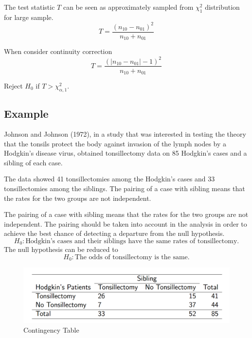 The test statistic $T$ can be seen as approximately sampled from $\chi^2_1$ distribution for large sample.
\[T = \frac{(n_{10} - n_{01})^2}{n_{10} + n_{01}}\]

When consider continuity correction
\[T = \frac{(|n_{10} - n_{01}| - 1 )^2}{n_{10} + n_{01}}\]

Reject $H_0$ if $T > \chi_{\alpha,1}^2$.

\subsection{Example}
Johnson and Johnson (1972), in a study that was interested in
testing the theory that the tonsils protect the body against
invasion of the lymph nodes by a Hodgkin's disease virus,
obtained tonsillectomy data on 85 Hodgkin's cases and a sibling
of each case.

The data showed 41 tonsillectomies among the Hodgkin's cases
and 33 tonsillectomies among the siblings.
The pairing of a case with sibling means that the rates for the
two groups are not independent.

The pairing of a case with sibling means that the rates for the
two groups are not independent.
The pairing should be taken into account in the analysis in order
to achieve the best chance of detecting a departure from the null
hypothesis.
\[H_0: \text{Hodgkin's cases and their siblings have the same rates of
 tonsillectomy.}\]
The null hypothesis can be reduced to 
\[H_0: \text{The odds of tonsillectomy is the same.}\]

\begin{figure}[H]
	\centering
	\includegraphics[width=0.7\linewidth]{fig/screenshot009}
	\caption{Contingency Table}
	\label{fig:screenshot009}
\end{figure}


